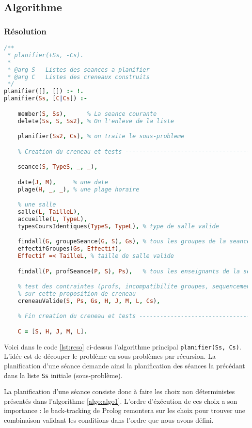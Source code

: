 
\subsection{Algorithme}

\subsubsection{Résolution}

\begin{lstlisting}[language=Prolog, caption=Resolution, captionpos=b,
label={lst:reso}]
/**
 * planifier(+Ss, -Cs).
 *
 * @arg S   Listes des seances a planifier
 * @arg C   Listes des creneaux construits
 */
planifier([], []) :- !.
planifier(Ss, [C|Cs]) :-

    member(S, Ss),      % La seance courante
    delete(Ss, S, Ss2), % On l'enleve de la liste

    planifier(Ss2, Cs), % on traite le sous-probleme

    % Creation du creneau et tests ---------------------------------------------

    seance(S, TypeS, _, _),

    date(J, M),     % une date
    plage(H, _, _), % une plage horaire

    % une salle
    salle(L, TailleL),
    accueille(L, TypeL),
    typesCoursIdentiques(TypeS, TypeL), % type de salle valide

    findall(G, groupeSeance(G, S), Gs), % tous les groupes de la seance
    effectifGroupes(Gs, Effectif),
    Effectif =< TailleL, % taille de salle valide

    findall(P, profSeance(P, S), Ps),   % tous les enseignants de la seance

    % test des contraintes (profs, incompatibilite groupes, sequencement)
    % sur cette proposition de creneau
    creneauValide(S, Ps, Gs, H, J, M, L, Cs),

    % Fin creation du creneau et tests -----------------------------------------

    C = [S, H, J, M, L].
\end{lstlisting}

Voici dans le code \ref{lst:reso} ci-dessus l'algorithme principal \texttt{planifier(Ss,
Cs)}.
L'idée est de découper le problème en sous-problèmes par récursion. La
planification d'une séance demande ainsi la planification des séances la
précédant dans la liste \texttt{Ss} initiale (sous-problème).

La planification d'une séance consiste donc à faire les choix non déterministes
présentés dans l'algorithme \ref{algo:algo1}. L'ordre d'éxécution de ces choix
a son importance : le back-tracking de Prolog remontera sur les choix pour
trouver une combinaison validant les conditions dans l'ordre que nous avons
défini.

